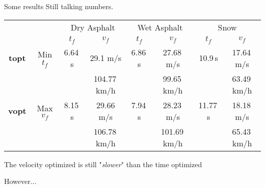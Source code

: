 \begin{frame}{Some results}
    Still talking numbers.
    \begin{table}[h!]
        \centering
        \begin{tabular}{c|c|c|c|c|c|c|c}
            & & \multicolumn{2}{c|}{Dry Asphalt} & \multicolumn{2}{c|}{Wet Asphalt} & \multicolumn{2}{c}{Snow}\\
            & & $t_f$ & $v_f$ & $t_f$ & $v_f$ & $t_f$ & $v_f$\\
            \hline
            \textbf{topt} & Min $t_f$ & 6.64\,s & 29.1 m/s & 6.86\,s & 27.68\,m/s & 10.9\,s & 17.64\,m/s\\
            & & & 104.77\,km/h & & 99.65\,km/h & & 63.49\,km/h\\
            \textbf{vopt} & Max $v_f$ & 8.15\,s & 29.66 m/s & 7.94\,s & 28.23\,m/s & 11.77\,s & 18.18\,m/s\\
            & & & 106.78\,km/h & & 101.69\,km/h & & 65.43\,km/h\\
        \end{tabular}
    \end{table}
    \pause
    \begin{block}{}
        The velocity optimized is still "\textit{slower}" than the time optimized
    \end{block}

    However$\dots$
\end{frame}